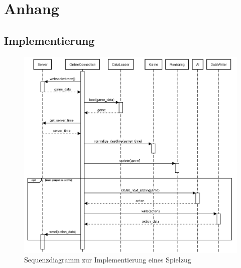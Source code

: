 \chapter{Anhang}
\label{ch:anhang}

\section{Implementierung}
\label{sec:anhang-implementierung}

\begin{figure}[htb]
	\centering
	\includegraphics[width=13.5cm]{Bilder/Sequenzdiagramm_Implementierung_Spielzug.png}
	\caption{Sequenzdiagramm zur Implementierung eines Spielzug}
	\label{fig:sequenzdiagramm-spielzug}
\end{figure}